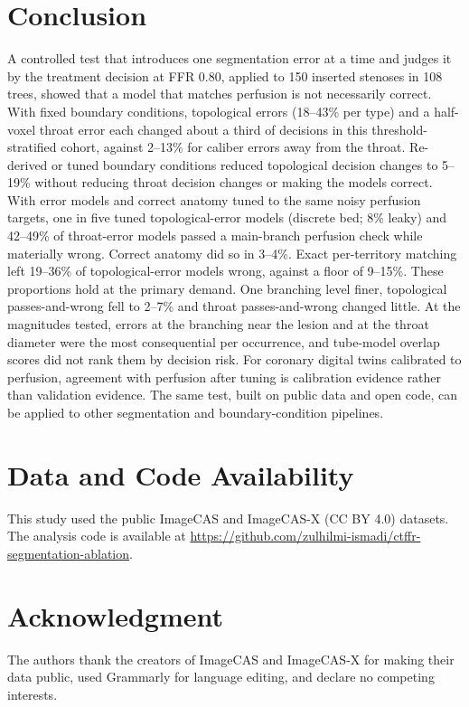 \documentclass[journal,twoside,web]{ieeecolor}
\begin{document}
\section{Conclusion}
A controlled test that introduces one segmentation error at a time and judges it by the treatment decision at FFR 0.80,
applied to 150 inserted stenoses in 108 trees, showed that a model that matches perfusion is not necessarily correct. With fixed boundary conditions, topological errors (18--43\% per type) and a half-voxel throat error each changed about a third of decisions in this threshold-stratified cohort, against 2--13\% for caliber errors away from the throat. Re-derived or tuned boundary conditions reduced topological decision changes to 5--19\% without reducing throat decision changes or making the models correct. With error models and correct anatomy tuned to the same noisy perfusion targets, one in five tuned topological-error models (discrete bed; 8\% leaky) and 42--49\% of throat-error models passed a main-branch perfusion check while materially wrong. Correct anatomy did so in 3--4\%. Exact per-territory matching left 19--36\% of topological-error models wrong, against a floor of 9--15\%. These proportions hold at the primary demand. One branching level finer, topological passes-and-wrong fell to 2--7\% and throat passes-and-wrong changed little. At the magnitudes tested, errors at the branching near the lesion and at the throat diameter were the most consequential per occurrence, and tube-model overlap scores did not rank them by decision risk.
For coronary digital twins calibrated to perfusion, agreement with perfusion after tuning is calibration evidence
rather than validation evidence. The same test, built on public data and open code, can be applied to other segmentation and
boundary-condition pipelines.

\section*{Data and Code Availability}
This study used the public ImageCAS \cite{zeng2023} and ImageCAS-X \cite{imagecasx_data} (CC BY 4.0) datasets. The analysis code is available at \url{https://github.com/zulhilmi-ismadi/ctffr-segmentation-ablation}.

\section*{Acknowledgment}
The authors thank the creators of ImageCAS and ImageCAS-X for making their data public, used Grammarly for language editing, and declare no competing interests.



\end{document}
